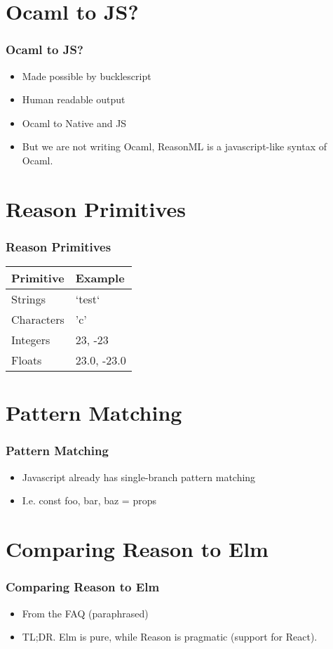 \documentclass{beamer}
\begin{document}
\section{Ocaml to JS?}
\begin{frame}
  \frametitle{Ocaml to JS?}
  \pause
  \begin{itemize}
  \item<2-> Made possible by bucklescript
  \item<3-> Human readable output
  \item<4-> Ocaml to Native and JS
  \item<5-> But we are not writing Ocaml, ReasonML is a javascript-like syntax of Ocaml.
  \end{itemize}
\end{frame}

\section{Reason Primitives}
\begin{frame}
  \frametitle{Reason Primitives}
    \begin{tabular}{ | l | p{5cm} |}
      \hline
      Primitive & Example \\ \hline
      Strings & `test` \\ \hline
      Characters & 'c' \\ \hline
      Integers & 23, -23 \\ \hline
      Floats & 23.0, -23.0 \\
      \hline
    \end{tabular}
\end{frame}

\section{Pattern Matching}
\begin{frame}
  \frametitle{Pattern Matching}
  \begin{itemize}
  \item<2-> Javascript already has single-branch pattern matching
  \item<3-> I.e. const {foo, bar, baz} = props
  \end{itemize}
\end{frame}



\section{Comparing Reason to Elm}
\begin{frame}
  \frametitle{Comparing Reason to Elm}
  \begin{itemize}
  \item<2-> From the FAQ (paraphrased)
  \item<3-> TL;DR. Elm is pure, while Reason is pragmatic (support for React).
  \end{itemize}
\end{frame}
\end{document}

